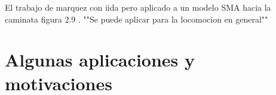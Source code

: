 El trabajo de marquez con iida pero aplicado a un modelo SMA hacia la caminata figura 2.9 \cite{HauserS2013}. ""Se puede aplicar para la locomocion en general""


\section{Algunas aplicaciones y motivaciones}
\label{sec:motivaciones}




